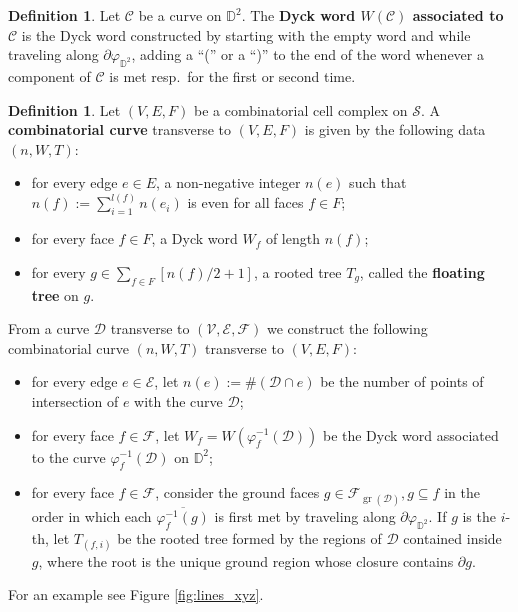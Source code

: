 \documentclass[11pt,reqno]{amsart}
\theoremstyle{plain}
\theoremstyle{definition}
\newtheorem{definition}[subsection]{Definition}
\theoremstyle{remark}
\numberwithin{equation}{subsection}
\newcommand*{\bbD}{\mathbb{D}}
\newcommand*{\calC}{\mathcal{C}}
\newcommand*{\calD}{\mathcal{D}}
\newcommand*{\calE}{\mathcal{E}}
\newcommand*{\calF}{\mathcal{F}}
\newcommand*{\calS}{\mathcal{S}}
\newcommand*{\calV}{\mathcal{V}}
\DeclareMathOperator{\gr}{gr}
\begin{document}
\begin{definition}
    Let $\calC$ be a curve on $\bbD^2$. The \textbf{Dyck word $W(\calC)$ associated to $\calC$} is the Dyck word constructed by starting with the empty word and while traveling along $\partial\varphi_{\bbD^2}$, adding a ``('' or a ``)'' to the end of the word whenever a component of $\calC$ is met resp.\ for the first or second time.
\end{definition}

\begin{definition}\label{def:combcurve}
    Let $(V,E,F)$ be a combinatorial cell complex on $\calS$. A \textbf{combinatorial curve} transverse to $(V,E,F)$ is given by the following data $(n,W,T)$:
    \begin{itemize}
        \item for every edge $e\in E$, a non-negative integer $n(e)$ such that $n(f):=\sum_{i=1}^{l(f)}n(e_i)$ is even for all faces $f\in F$;
        \item for every face $f\in F$, a Dyck word $W_f$ of length $n(f)$;
        \item for every $g\in\sum_{f\in F}[n(f)/2+1]$, a rooted tree $T_g$, called the \textbf{floating tree} on $g$.
    \end{itemize}

    From a curve $\calD$ transverse to $(\calV,\calE,\calF)$ we construct the following combinatorial curve $(n,W,T)$ transverse to $(V,E,F)$:
    \begin{itemize}
        \item for every edge $e\in\calE$, let $n(e):=\#(\calD\cap e)$ be the number of points of intersection of $e$ with the curve $\calD$;
        \item for every face $f\in\calF$, let $W_f=W(\varphi_f^{-1}(\calD))$ be the Dyck word associated to the curve $\varphi_f^{-1}(\calD)$ on $\bbD^2$;
        \item for every face $f\in\calF$, consider the ground faces $g\in\calF_{\gr(\calD)},g\subseteq f$ in the order in which each $\overline{\varphi_f^{-1}(g)}$ is first met by traveling along $\partial\varphi_{\bbD^2}$. If $g$ is the $i$-th, let $T_{(f,i)}$ be the rooted tree formed by the regions of $\calD$ contained inside $g$, where the root is the unique ground region whose closure contains $\partial g$.
    \end{itemize}  
\end{definition}

For an example see Figure \ref{fig:lines_xyz}.
\end{document}
